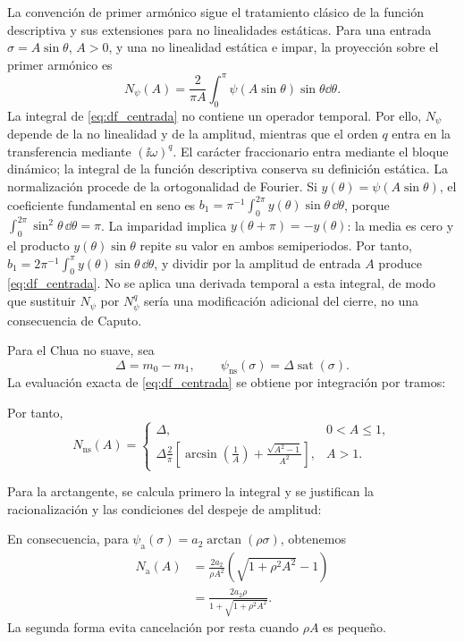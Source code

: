 La convención de primer armónico sigue el
tratamiento clásico de la función descriptiva y sus extensiones para
no linealidades estáticas\cite{GelbVanderVelde1968,Atherton1975,AthertonTanYerogluKavuranYuce2014}.
Para una entrada \(\sigma=A\sin\theta\), \(A>0\), y una no linealidad
estática e impar, la proyección sobre el primer armónico es
\begin{equation}
N_\psi(A)
=\frac{2}{\pi A}\int_0^\pi
\psi(A\sin\theta)\sin\theta\dd\theta.
\label{eq:df_centrada}
\end{equation}
La integral de \cref{eq:df_centrada} no contiene un operador temporal. Por
ello, \(N_\psi\) depende de la no linealidad y de la amplitud, mientras que el
orden \(q\) entra en la transferencia mediante
\((\ii\omega)^q\). El carácter fraccionario entra mediante el bloque dinámico;
la integral de la función descriptiva conserva su definición estática.
La normalización procede de la ortogonalidad de Fourier. Si
\(y(\theta)=\psi(A\sin\theta)\), el coeficiente fundamental en seno es
\(b_1=\pi^{-1}\int_0^{2\pi}y(\theta)\sin\theta\,\dd\theta\), porque
\(\int_0^{2\pi}\sin^2\theta\,\dd\theta=\pi\). La imparidad implica
\(y(\theta+\pi)=-y(\theta)\): la media es cero y el producto
\(y(\theta)\sin\theta\) repite su valor en ambos semiperiodos. Por tanto,
\(b_1=2\pi^{-1}\int_0^\pi y(\theta)\sin\theta\,\dd\theta\), y
dividir por la amplitud de entrada \(A\) produce \cref{eq:df_centrada}. No se aplica una derivada temporal a
esta integral, de modo que sustituir \(N_\psi\) por \(N_\psi^q\) sería
una modificación adicional del cierre, no una consecuencia de Caputo.

Para el Chua no suave, sea
\[
\Delta=m_0-m_1,\qquad
\psi_{\mathrm{ns}}(\sigma)=\Delta\operatorname{sat}(\sigma).
\]
La evaluación exacta de \cref{eq:df_centrada} se obtiene por integración por
tramos:
\begingroup
\def\HAFOderivationpart{6}

\endgroup
Por tanto,
\begin{equation}
N_{\mathrm{ns}}(A)=
\begin{cases}
\Delta,&0<A\leq1,\\[1mm]
\displaystyle
\Delta\frac{2}{\pi}
\left[
\arcsin\!\left(\frac1A\right)
+\frac{\sqrt{A^2-1}}{A^2}
\right],&A>1.
\end{cases}
\label{eq:df_saturacion}
\end{equation}

Para la arctangente, se calcula primero la integral y se justifican la
racionalización y las condiciones del despeje de amplitud:
\begingroup
\def\HAFOderivationpart{8}

\endgroup
En consecuencia, para
\(\psi_{\mathrm a}(\sigma)=a_2\arctan(\rho\sigma)\), obtenemos
\begin{equation}
\begin{aligned}
N_{\mathrm a}(A)
&=\frac{2a_2}{\rho A^2}
\left(\sqrt{1+\rho^2A^2}-1\right)\\
&=\frac{2a_2\rho}
{1+\sqrt{1+\rho^2A^2}}.
\end{aligned}
\label{eq:df_arctan}
\end{equation}
La segunda forma evita cancelación por resta cuando \(\rho A\) es pequeño.

